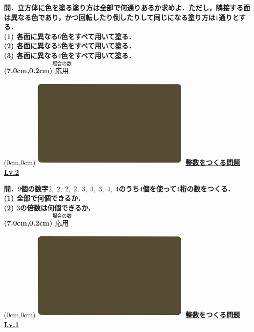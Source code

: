 \documentclass[10pt,
fleqn,
dvipdfmx,
uplatex
]{jsarticle}
\begin{document}
\small 
\bf\boldmath 問．立方体に色を塗る塗り方は全部で何通りあるか求めよ．ただし，隣接する面は異なる色であり，かつ回転したり倒したりして同じになる塗り方は$1$通りとする．\\
(1)  各面に異なる$6$色をすべて用いて塗る．\\
(2)  各面に異なる$5$色をすべて用いて塗る．\\
(3)  各面に異なる$4$色をすべて用いて塗る．\\

\at(7.0cm,0.2cm){\small\color{bradorange}$\overset{\text{場合の数}}{\text{応用}}$}


\newpage



\at(0cm,0cm){\includegraphics[width=8cm,bb=0 0 1920 1080]{./youtube/thumbnails/templates/smart_background/場合の数.jpeg}}
{\color{orange}\bf\boldmath\LARGE\underline{整数をつくる問題 Lv.2 }}\vspace{0.3zw}

\large 
\bf\boldmath 問．$9$個の数字$2,\;2,\;2,\;2,\;3,\;3,\;3,\;4,\;4$のうち$4$個を使って$4$桁の数をつくる．\\
(1)  全部で何個できるか．\\
(2)  $3$の倍数は何個できるか．\\

\at(7.0cm,0.2cm){\small\color{bradorange}$\overset{\text{場合の数}}{\text{応用}}$}


\newpage



\at(0cm,0cm){\includegraphics[width=8cm,bb=0 0 1920 1080]{./youtube/thumbnails/templates/smart_background/場合の数.jpeg}}
{\color{orange}\bf\boldmath\LARGE\underline{整数をつくる問題 Lv.1 }}\vspace{0.3zw}
\end{document}
